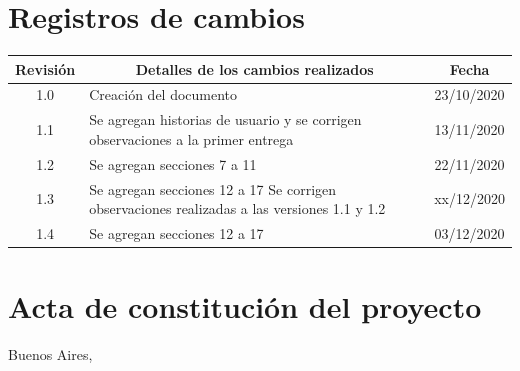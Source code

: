 \documentclass[11pt]{charter}
\begin{document}
\maketitle
\thispagestyle{empty}
\pagebreak


\thispagestyle{empty}
{\setlength{\parskip}{0pt}
\tableofcontents{}
}
\pagebreak


\section{Registros de cambios}
\label{sec:registro}


\begin{table}[ht]
\label{tab:registro}
\centering
\begin{tabularx}{\linewidth}{@{}|c|X|c|@{}}
\hline
\rowcolor[HTML]{C0C0C0} 
Revisión & \multicolumn{1}{c|}{\cellcolor[HTML]{C0C0C0}Detalles de los cambios realizados} & Fecha      \\ \hline
1.0      & Creación del documento                                          & 23/10/2020 \\ \hline
1.1      & Se agregan historias de usuario y se corrigen observaciones a la primer entrega                                 & 13/11/2020 \\ \hline
1.2      & Se agregan secciones 7 a 11 & 22/11/2020\\ \hline
1.3      & Se agregan secciones 12 a 17  \newline
 Se corrigen observaciones realizadas a las versiones 1.1 y 1.2 & xx/12/2020 \\ \hline
1.4      & Se agregan secciones 12 a 17 & 03/12/2020\\ \hline 
\end{tabularx}
\end{table}

\pagebreak



\section{Acta de constitución del proyecto}
\label{sec:acta}

\begin{flushright}
Buenos Aires, \fechaInicioName
\end{flushright}
\end{document}
